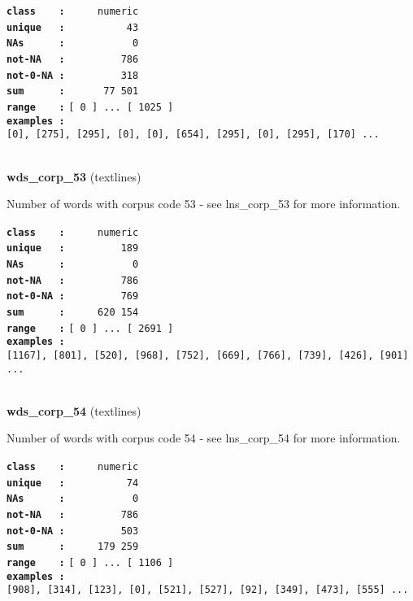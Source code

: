 \documentclass[]{article}
\begin{document}
\textbf{\texttt{class\ \ \ \ :}} \texttt{~~~~~numeric}\\
\textbf{\texttt{unique\ \ \ :}} \texttt{~~~~~~~~~~43}\\
\textbf{\texttt{NAs\ \ \ \ \ \ :}} \texttt{~~~~~~~~~~~0}\\
\textbf{\texttt{not-NA\ \ \ :}} \texttt{~~~~~~~~~786}\\
\textbf{\texttt{not-0-NA\ :}} \texttt{~~~~~~~~~318}\\
\textbf{\texttt{sum\ \ \ \ \ \ :}} \texttt{~~~~~~77~501}\\
\textbf{\texttt{range\ \ \ \ :}}
\texttt{{[}\ 0\ {]}\ ...\ {[}\ 1025\ {]}}\\
\textbf{\texttt{examples\ :}}
\texttt{{[}0{]},\ {[}275{]},\ {[}295{]},\ {[}0{]},\ {[}0{]},\ {[}654{]},\ {[}295{]},\ {[}0{]},\ {[}295{]},\ {[}170{]}\ ...}\\

~

\textbf{wds\_corp\_53} (textlines)

Number of words with corpus code 53 - see lns\_corp\_53 for more
information.

\textbf{\texttt{class\ \ \ \ :}} \texttt{~~~~~numeric}\\
\textbf{\texttt{unique\ \ \ :}} \texttt{~~~~~~~~~189}\\
\textbf{\texttt{NAs\ \ \ \ \ \ :}} \texttt{~~~~~~~~~~~0}\\
\textbf{\texttt{not-NA\ \ \ :}} \texttt{~~~~~~~~~786}\\
\textbf{\texttt{not-0-NA\ :}} \texttt{~~~~~~~~~769}\\
\textbf{\texttt{sum\ \ \ \ \ \ :}} \texttt{~~~~~620~154}\\
\textbf{\texttt{range\ \ \ \ :}}
\texttt{{[}\ 0\ {]}\ ...\ {[}\ 2691\ {]}}\\
\textbf{\texttt{examples\ :}}
\texttt{{[}1167{]},\ {[}801{]},\ {[}520{]},\ {[}968{]},\ {[}752{]},\ {[}669{]},\ {[}766{]},\ {[}739{]},\ {[}426{]},\ {[}901{]}\ ...}\\

~

\textbf{wds\_corp\_54} (textlines)

Number of words with corpus code 54 - see lns\_corp\_54 for more
information.

\textbf{\texttt{class\ \ \ \ :}} \texttt{~~~~~numeric}\\
\textbf{\texttt{unique\ \ \ :}} \texttt{~~~~~~~~~~74}\\
\textbf{\texttt{NAs\ \ \ \ \ \ :}} \texttt{~~~~~~~~~~~0}\\
\textbf{\texttt{not-NA\ \ \ :}} \texttt{~~~~~~~~~786}\\
\textbf{\texttt{not-0-NA\ :}} \texttt{~~~~~~~~~503}\\
\textbf{\texttt{sum\ \ \ \ \ \ :}} \texttt{~~~~~179~259}\\
\textbf{\texttt{range\ \ \ \ :}}
\texttt{{[}\ 0\ {]}\ ...\ {[}\ 1106\ {]}}\\
\textbf{\texttt{examples\ :}}
\texttt{{[}908{]},\ {[}314{]},\ {[}123{]},\ {[}0{]},\ {[}521{]},\ {[}527{]},\ {[}92{]},\ {[}349{]},\ {[}473{]},\ {[}555{]}\ ...}\\
\end{document}
